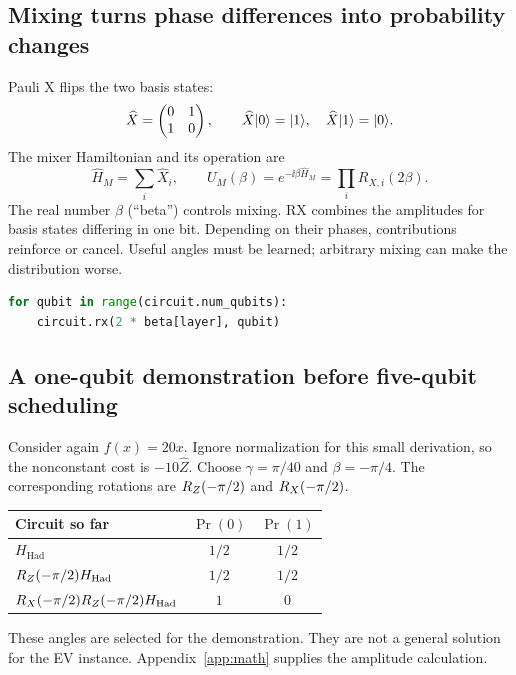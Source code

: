 \subsection{Mixing turns phase differences into probability changes}
Pauli X flips the two basis states:
\begin{equation}
\widehat X=\begin{pmatrix}0&1\\1&0\end{pmatrix},\qquad
\widehat X\lvert 0\rangle=\lvert 1\rangle,\quad \widehat X\lvert 1\rangle=\lvert 0\rangle.
\end{equation}
The mixer Hamiltonian and its operation are
\begin{equation}
\widehat H_M=\sum_i\widehat X_i,\qquad
U_M(\beta)=e^{-\ii\beta\widehat H_M}
=\prod_i R_{X,i}(2\beta).
\end{equation}
The real number $\beta$ (``beta'') controls mixing. RX combines the amplitudes
for basis states differing in one bit. Depending on their phases, contributions
reinforce or cancel. Useful angles must be learned; arbitrary mixing can make
the distribution worse.
\begin{lstlisting}[language=Python]
for qubit in range(circuit.num_qubits):
    circuit.rx(2 * beta[layer], qubit)
\end{lstlisting}

\subsection{A one-qubit demonstration before five-qubit scheduling}
Consider again $f(x)=20x$. Ignore normalization for this small derivation, so
the nonconstant cost is $-10\widehat Z$. Choose $\gamma=\pi/40$ and
$\beta=-\pi/4$. The corresponding rotations are $R_{Z}(-\pi/2)$ and
$R_{X}(-\pi/2)$.
\begin{center}
\begin{tabular}{lcc}
\toprule
Circuit so far & $\Pr(0)$ & $\Pr(1)$\\
\midrule
$H_{\mathrm{Had}}$ & $1/2$ & $1/2$\\
$R_{Z}(-\pi/2)H_{\mathrm{Had}}$ & $1/2$ & $1/2$\\
$R_{X}(-\pi/2)R_{Z}(-\pi/2)H_{\mathrm{Had}}$ & $1$ & $0$\\
\bottomrule
\end{tabular}
\end{center}
These angles are selected for the demonstration. They are not a general solution
for the EV instance. Appendix~\ref{app:math} supplies the amplitude calculation.


